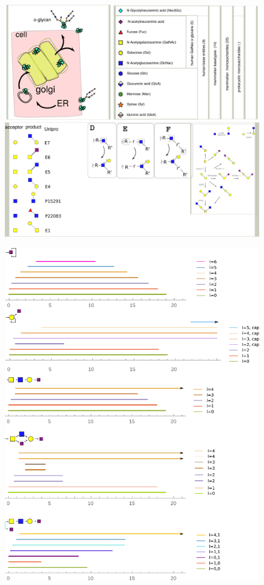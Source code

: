 \documentclass{article}
\begin{document}
\begin{figure}
\includegraphics[width=\textwidth]{SuppFig_1.pdf}
\end{figure}

\begin{figure}
\includegraphics[width=\textwidth]{SuppFig_3.pdf}
\end{figure}
\end{document}
